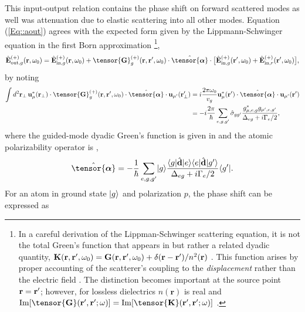 \documentclass[preprint, aps,pra,onecolumn]{revtex4-1} %
\newcommand{\inp}{{\rm in}}
\newcommand{\out}{{\rm out}}
\newcommand{\poltens}{\hat{\tensor{\boldsymbol{\alpha}}}}
\begin{document}
This input-output relation contains the phase shift on forward scattered modes as well was attenuation due to elastic scattering into all other modes. Equation (\ref{Eq::aout}) agrees with the expected form given by the Lippmann-Schwinger equation in the first Born approximation \footnote{In a careful derivation of the Lippman-Schwinger scattering equation, it is not the total Green's function that appears in  but rather a related dyadic quantity, $\mathbf{K}(\mathbf{r},\mathbf{r}', \omega_0) = \mathbf{G}(\mathbf{r},\mathbf{r}', \omega_0) + \delta(\mathbf{r}-\mathbf{r}')/n^2(\mathbf{r})$ \cite{wubs_multiple-scattering_2004}. 
This function arises by proper accounting of the scatterer's coupling to the \emph{displacement} rather than the electric field \cite{yao_ultrahigh_2009}.  The distinction becomes important at the source point $\mathbf{r} = \mathbf{r}'$; however, for lossless dielectrics $n(\mathbf{r})$ is real and ${\rm Im}[\tensor{\mathbf{G}}(\br',\br'; \omega)] = {\rm Im}[\tensor{\mathbf{K}}(\br',\br'; \omega)]$ \cite{yao_-chip_2010}. },
	\begin{equation} \label{Eq::IOScatteredField}
		\hat{\mathbf{E}}^{(+)}_{\out,g}(\br, \omega_0)=\hat{\mathbf{E}}^{(+)}_{ \inp, g}(\br, \omega_0)+\tensor{\mathbf{G}}_g^{(+)}(\br,\br', \omega_0)\cdot \poltens \cdot \big[\hat{\mathbf{E}}^{(+)}_{\inp, g}(\br', \omega_0)+\hat{\mathbf{E}}^{(+)}_{\inp,r}(\br', \omega_0) \big],
	\end{equation}
by noting
	\begin{align}
		\int d^2 \mbf{r}_\perp \, \mathbf{u}^*_{\mu} (\br_\perp)\cdot \tensor{\mathbf{G}}_g^{(+)}(\br,\br',\omega_0)\cdot \poltens \cdot \mathbf{u}_{\mu'} (\br'_\perp) &= i \frac{ 2\pi \omega_0}{v_g} \mathbf{u}^*_\mu (\br') \cdot \poltens \cdot \mathbf{u}_{\mu'} (\br') \\
		& = - i \frac{2 \pi}{\hbar} \sum_{e,g,g'}  \hat{\sigma}_{gg'} \frac{g_{\mu,e,g}^* g_{\mu',e,g'}}{ \Delta_{eg} + i \Gamma_{e}/2 }, 
	\end{align}
where the guided-mode dyadic Green's function is given in  and the atomic polarizability operator is \cite{buhmann_casimir-polder_2004, deutsch_quantum_2010,kien_dynamical_2013},
	\begin{equation} \label{Eq::PolarizabilityOperator}
		\poltens = - \frac{1}{\hbar} \sum_{e,g,g'}\ket{g}\frac{\bra{g}\hat{\mathbf{d}}\ket{e}\bra{e} 
\hat{\mathbf{d}}\ket{g'}}{\Delta_{eg} + i \Gamma_{e}/2 }\bra{g'}.
	\end{equation}	
For an atom in ground state $\lvert{g}\rangle$ and polarization $p$, the phase shift can be expressed as \cite{le_kien_propagation_2014}
\end{document}
